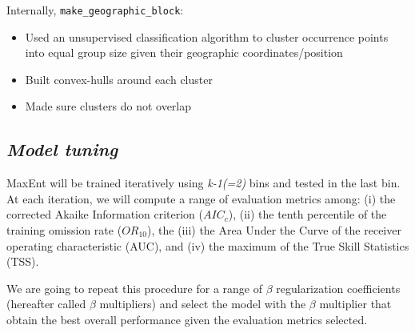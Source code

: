 \documentclass[
]{article}
\begin{document}
\begin{infobox}

Internally, \texttt{make\_geographic\_block}:

\begin{itemize}
\item
  Used an unsupervised classification algorithm to cluster occurrence
  points into equal group size given their geographic
  coordinates/position
\item
  Built convex-hulls around each cluster
\item
  Made sure clusters do not overlap
\end{itemize}

\end{infobox}

\hypertarget{model-tuning}{%
\subsection{\texorpdfstring{\emph{Model
tuning}}{Model tuning}}\label{model-tuning}}

MaxEnt will be trained iteratively using \emph{k-1(=2)} bins and tested
in the last bin. At each iteration, we will compute a range of
evaluation metrics among: (i) the corrected Akaike Information criterion
(\(AIC_c\)), (ii) the tenth percentile of the training omission rate
(\(OR_{10}\)), the (iii) the Area Under the Curve of the receiver
operating characteristic (AUC), and (iv) the maximum of the True Skill
Statistics (TSS).

We are going to repeat this procedure for a range of \(\beta\)
regularization coefficients (hereafter called \(\beta\) multipliers) and
select the model with the \(\beta\) multiplier that obtain the best
overall performance given the evaluation metrics selected.
\end{document}
